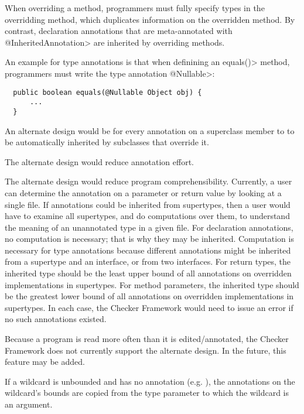 
When overriding a method, programmers must fully specify types in the overridding
method, which duplicates information on the overridden method.
By contrast, declaration annotations that are meta-annotated with
\<@InheritedAnnotation> are inherited by overriding methods.

An example for type annotations is that when definining an \<equals()>
method, programmers must write the type annotation \<@Nullable>:

\begin{Verbatim}
  public boolean equals(@Nullable Object obj) {
      ...
  }
\end{Verbatim}

An alternate design would be for every annotation on a superclass member to
to be automatically inherited by subclasses that override it.

The alternate design would reduce annotation effort.

The alternate design would reduce program comprehensibility.
Currently, a user can determine the annotation on a parameter or return
value by looking at a single file.  If annotations could be inherited from
supertypes, then a user would have to examine all supertypes, and do
computations over them, to understand the meaning of an unannotated type in
a given file.
For declaration annotations, no computation is necessary; that is why they
may be inherited.
Computation is necessary for type annotations because different annotations might be inherited
from a supertype and an interface, or from two interfaces.  For return
types, the inherited type should be the least upper bound of all
annotations on overridden implementations in supertypes.  For method
parameters, the inherited type should be the greatest lower bound of all
annotations on overridden implementations in supertypes.  In each case, the
Checker Framework would need to issue an error if no such annotations existed.

Because a program is read more often than it is edited/annotated, the
Checker Framework does not currently support the alternate design.  In the
future, this feature may be added.



If a wildcard is unbounded and has no annotation (e.g. ),
the annotations on the wildcard's bounds are copied from the type parameter
to which the wildcard is an argument.

